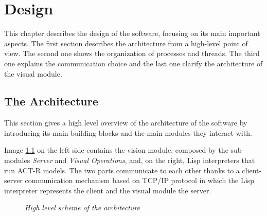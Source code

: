 \chapter{Design}\label{chDesign}
	This chapter describes the design of the software, focusing on its main important aspects.
	The first section describes the architecture from a high-level point of view.
	The second one shows the organization of processes and threads.
	The third one explains the communication choice and the last one clarify the architecture of the visual module. 
	
	\section{The Architecture}
	This section gives a high level overview of the architecture of the software by introducing its main building blocks and the main modules they interact with. 
  
	Image \ref{fig:architecture} on the left side contains the vision module, composed by the sub-modules \emph{Server} and \emph{Visual Operations}, and, on the right, \mbox{Lisp} interpreters that run \mbox{ACT-R} models.
	The two parts communicate to each other thanks to a \mbox{client-server} communication mechanism based on \mbox{TCP/IP} protocol in which the \mbox{Lisp} interpreter represents the client and the visual module the server.
	
	\begin{figure}[h]
	  \begin{center} 
	  \end{center} 
	  \caption{\textit{High level scheme of the architecture}}  
	  \label{fig:architecture}
 	\end{figure}


